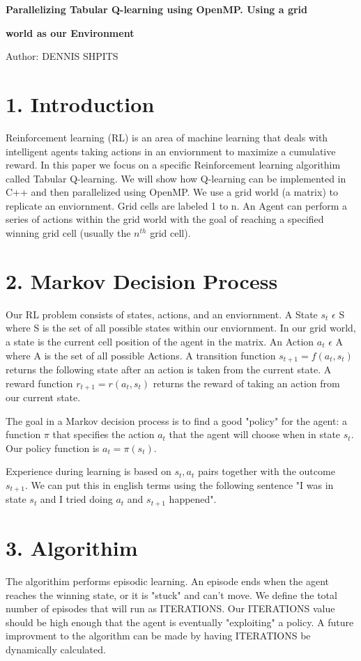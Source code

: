 \documentclass[12pt]{article}
\begin{document}
\textbf{Parallelizing Tabular Q-learning using OpenMP. Using a grid} 
\centerline{\textbf{world as our Environment}}

\centerline{Author: DENNIS SHPITS}


\section*{1. Introduction}

Reinforcement learning (RL) is an area of machine learning that deals with intelligent
agents taking actions in an enviornment to maximize a cumulative reward. In this paper 
we focus on a specific Reinforcement learning algorithim called Tabular Q-learning. 
We will show how Q-learning can be implemented in C++ and then parallelized using OpenMP. 
We use a grid world (a matrix) to replicate an enviornment. Grid cells are labeled 1 to n. 
An Agent can perform a series of actions within the grid world with the goal of reaching a specified 
winning grid cell (usually the $n^{th}$ grid cell). 

\section*{2. Markov Decision Process}

Our RL problem consists of states, actions, and an enviornment. A State $s_t$  $\epsilon$ S where S is the set of all possible states within our enviornment.
In our grid world, a state is the current cell position of the agent in the 
matrix. An Action $a_t$ $\epsilon$ A where A is the set of all possible Actions.
A transition function $s_{t+1} = f(a_t,s_t)$ returns the following state 
after an action is taken from the current state. A reward function $r_{t+1} = r(a_t,s_t)$ returns the reward of taking an
action from our current state.

The goal in a Markov decision process is to find a good "policy" for the agent: a function $\pi$ that specifies the action $a_t$ that the agent will choose when in state $s_t$. Our policy function is $a_t=\pi(s_t)$.

Experience during learning is based on $s_t,a_t$ pairs together with the outcome 
$s_{t+1}$. We can put this in english terms using the following sentence "I was in state $s_t$ and I tried doing $a_t$ and $s_{t+1}$ happened".

\section*{3. Algorithim}
The algorithim performs episodic learning. An episode ends when the agent reaches the winning state, or it is "stuck" and can't move. 
We define the total number of episodes that will run as ITERATIONS. 
Our ITERATIONS value should be high enough that the agent is eventually "exploiting"
a policy. A future improvment to the algorithm can be made by
having ITERATIONS be dynamically calculated.
\end{document}

